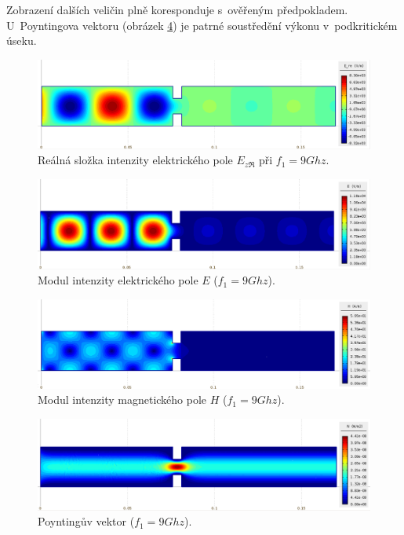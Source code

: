 Zobrazení dalších veličin plně koresponduje s~ověřeným předpokladem. U~Poyntingova vektoru (obrázek \ref{obr:priklad_R100narrow_N}) je patrné soustředění výkonu v~podkritickém úseku.
\begin{figure}[!h]
	\centering
	\includegraphics[width=15cm]{priklad_R100narrow_Ere_9Ghz.png}
	\caption{Reálná složka intenzity elektrického pole $E_{z\Re}$ při $f_1 = 9\unit{Ghz}$.}
	\label{obr:priklad_R100narrow_Ere_9Ghz}
\end{figure}
\begin{figure}[!h]
	\centering
	\includegraphics[width=15cm]{priklad_R100narrow_E.png}
	\caption{Modul intenzity elektrického pole $E$ ($f_1 = 9\unit{Ghz}$).}
	\label{obr:priklad_R100narrow_N}
\end{figure}
\begin{figure}[!h]
	\centering
	\includegraphics[width=15cm]{priklad_R100narrow_H.png}
	\caption{Modul intenzity magnetického pole $H$ ($f_1 = 9\unit{Ghz}$).}
	\label{obr:priklad_R100narrow_H}
\end{figure}
\begin{figure}[!h]
	\centering
	\includegraphics[width=15cm]{priklad_R100narrow_N.png}
	\caption{Poyntingův vektor ($f_1 = 9\unit{Ghz}$).}
	\label{obr:priklad_R100narrow_N}
\end{figure}

